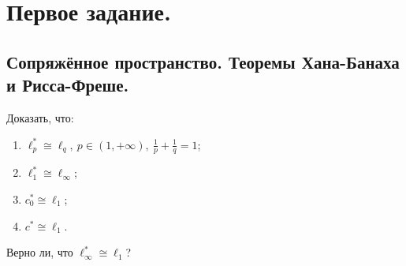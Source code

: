 \chapter{Первое задание.}
\section{Сопряжённое пространство. Теоремы Хана-Банаха и Рисса-Фреше.}
\begin{task}[9.1]
    Доказать, что:
    \begin{enumerate}
        \item $\ell_p^* \cong \ell_q, \ p \in (1, +\infty), \ \frac{1}{p} + \frac{1}{q} = 1$;
        \item $\ell_1^* \cong \ell_\infty$;
        \item $c_0^* \cong \ell_1$;
        \item $c^* \cong \ell_1$.
    \end{enumerate}
    Верно ли, что $\ell_\infty^* \cong \ell_1$?
\end{task}
